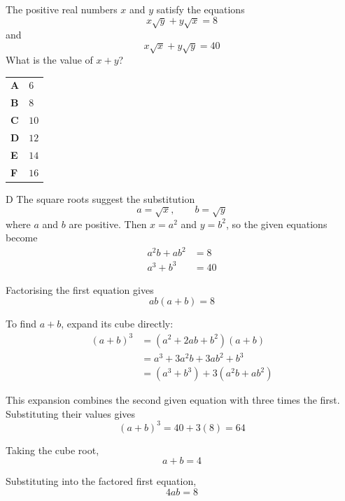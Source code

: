 \documentclass[11pt,a4paper]{article}
\begin{document}
\begin{enumerate}[label=\textbf{\arabic*.},leftmargin=*,itemsep=0pt,start=19]
\questionitem[Algebra]
The positive real numbers $x$ and $y$ satisfy the equations
\[x\sqrt{y} + y\sqrt{x} = 8\]
and
\[x\sqrt{x} + y\sqrt{y} = 40\]
What is the value of $x + y$?

\par\vspace*{12pt}
\begin{tabularx}{\linewidth}{@{}>{\bfseries}l Y@{}}
A &
$6$
\\[0.8em]
B &
$8$
\\[0.8em]
C &
$10$
\\[0.8em]
D &
$12$
\\[0.8em]
E &
$14$
\\[0.8em]
F &
$16$
\\
\end{tabularx}

\begin{djsSolution}{D}
The square roots suggest the substitution
\[
a=\sqrt{x},\qquad b=\sqrt{y}
\]
where $a$ and $b$ are positive. Then $x=a^2$ and $y=b^2$, so the given equations become
\[
\begin{aligned}
a^2b+ab^2&=8\\[5pt]
a^3+b^3&=40
\end{aligned}
\]

Factorising the first equation gives
\[
ab(a+b)=8
\]

To find $a+b$, expand its cube directly:
\[
\begin{aligned}
(a+b)^3
&=(a^2+2ab+b^2)(a+b)\\[5pt]
&=a^3+3a^2b+3ab^2+b^3\\[5pt]
&=(a^3+b^3)+3(a^2b+ab^2)
\end{aligned}
\]

This expansion combines the second given equation with three times the first. Substituting their values gives
\[
(a+b)^3=40+3(8)=64
\]

Taking the cube root,
\[
\boxed{a+b=4}
\]

Substituting into the factored first equation,
\[
4ab=8
\]


\end{djsSolution}
\end{enumerate}
\end{document}
